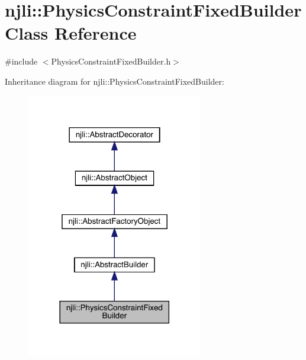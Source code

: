 \hypertarget{classnjli_1_1_physics_constraint_fixed_builder}{}\section{njli\+:\+:Physics\+Constraint\+Fixed\+Builder Class Reference}
\label{classnjli_1_1_physics_constraint_fixed_builder}


{\ttfamily \#include $<$Physics\+Constraint\+Fixed\+Builder.\+h$>$}



Inheritance diagram for njli\+:\+:Physics\+Constraint\+Fixed\+Builder\+:\nopagebreak
\begin{figure}[H]
\begin{center}
\leavevmode
\includegraphics[width=218pt]{classnjli_1_1_physics_constraint_fixed_builder__inherit__graph}
\end{center}
\end{figure}


